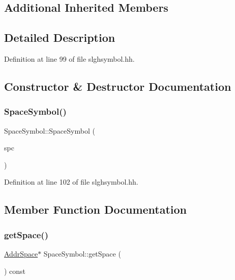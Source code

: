 \subsection*{Additional Inherited Members}


\subsection{Detailed Description}


Definition at line 99 of file slghsymbol.\+hh.



\subsection{Constructor \& Destructor Documentation}
\mbox{\label{class_space_symbol_a2a384f9010d6f8db0d515d4a3adcb643}} 
\subsubsection{\texorpdfstring{SpaceSymbol()}{SpaceSymbol()}}
{\footnotesize\ttfamily Space\+Symbol\+::\+Space\+Symbol (\begin{DoxyParamCaption}\item[{\mbox{\hyperlink{class_addr_space}{Addr\+Space}} $\ast$}]{spc }\end{DoxyParamCaption})\hspace{0.3cm}{\ttfamily [inline]}}



Definition at line 102 of file slghsymbol.\+hh.



\subsection{Member Function Documentation}
\mbox{\label{class_space_symbol_a25d2176392a721ae6dc112313a67eaae}} 
\subsubsection{\texorpdfstring{getSpace()}{getSpace()}}
{\footnotesize\ttfamily \mbox{\hyperlink{class_addr_space}{Addr\+Space}}$\ast$ Space\+Symbol\+::get\+Space (\begin{DoxyParamCaption}\item[{void}]{ }\end{DoxyParamCaption}) const\hspace{0.3cm}{\ttfamily [inline]}}



